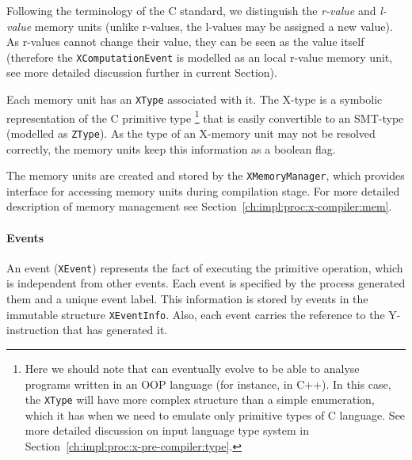 Following the terminology of the C standard, we distinguish the \textit{r-value} and \textit{l-value} memory units (unlike r-values, the l-values may be assigned a new value).
As r-values cannot change their value, they can be seen as the value itself (therefore the \texttt{XComputationEvent} is modelled as an local r-value memory unit, see more detailed discussion further in current Section).

Each memory unit has an \texttt{XType} associated with it.
The X-type is a symbolic representation of the C primitive type%
%
\footnote{Here we should note that \porthos[2] can eventually evolve to be able to analyse programs written in an OOP language (for instance, in C++). In this case, the \texttt{XType} will have more complex structure than a simple enumeration, which it has when we need to emulate only primitive types of C language. See more detailed discussion on input language type system in Section~\ref{ch:impl:proc:x-pre-compiler:type}.} %
%
that is easily convertible to an SMT-type (modelled as \texttt{ZType}).%
As the type of an X-memory unit may not be resolved correctly, the memory units keep this information as a boolean flag.

The memory units are created and stored by the \texttt{XMemoryManager}, which provides interface for accessing memory units during compilation stage.
For more detailed description of memory management see Section~\ref{ch:impl:proc:x-compiler:mem}.



\paragraph{Events}
\label{ch:impl:model:xgraph:evt}

An event (\texttt{XEvent}) represents the fact of executing the primitive operation, which is independent from other events.
Each event is specified by the process generated them and a unique event label.
This information is stored by events in the immutable structure \texttt{XEventInfo}.
Also, each event carries the reference to the Y-instruction that has generated it.

